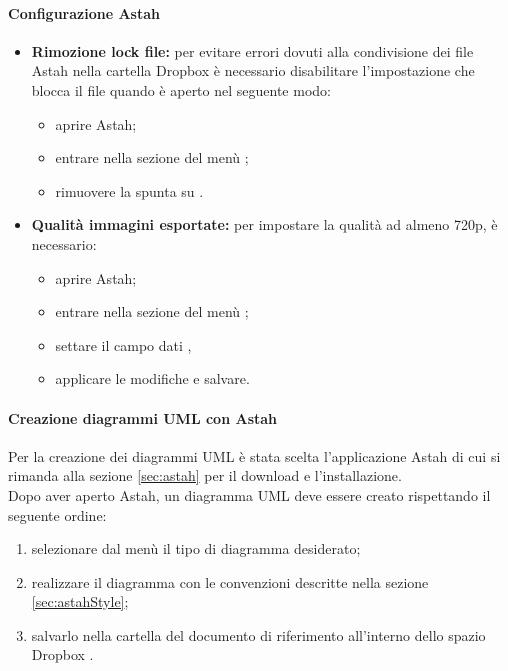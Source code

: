         	\paragraph{Configurazione Astah}
        		\begin{itemize}
        			\item \textbf{Rimozione lock file:} per evitare errori dovuti alla condivisione dei file Astah nella cartella Dropbox è necessario disabilitare l'impostazione che blocca il file quando è aperto nel seguente modo:
        				\begin{itemize}
        					\item aprire Astah;
        					\item entrare nella sezione del menù ;
        					\item rimuovere la spunta su .
        				\end{itemize}
        			\item \textbf{Qualità immagini esportate:} per impostare la qualità ad almeno 720p, è necessario:	
        				\begin{itemize}
        					\item aprire Astah;
        					\item entrare nella sezione del menù ;
        					\item settare il campo dati ,
        					\item applicare le modifiche e salvare.
        				\end{itemize}
        		\end{itemize}
        		
			\paragraph{Creazione diagrammi UML con Astah}
	        Per la creazione dei diagrammi UML è stata scelta l'applicazione Astah di cui si rimanda alla sezione \ref{sec:astah} per il download e l'installazione. \\
			Dopo aver aperto Astah, un diagramma UML deve essere creato rispettando il seguente ordine:
			\begin{enumerate}
				\item selezionare dal menù  il tipo di diagramma desiderato;
				\item realizzare il diagramma con le convenzioni descritte nella sezione \ref{sec:astahStyle};
				\item salvarlo nella cartella del documento di riferimento all'interno dello spazio Dropbox .
			\end{enumerate}
